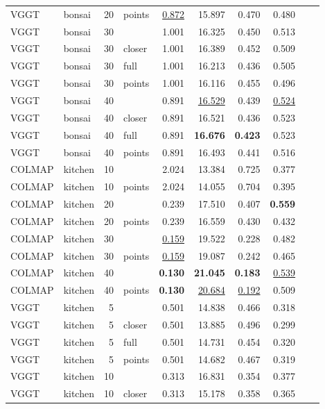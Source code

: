 \begin{table}[H]
\begin{tabular}{llrlrrrrll}
VGGT & bonsai & 20 & points & \underline{0.872} & 15.897 & 0.470 & 0.480 &  &  \\
VGGT & bonsai & 30 &  & 1.001 & 16.325 & 0.450 & 0.513 &  &  \\
VGGT & bonsai & 30 & closer & 1.001 & 16.389 & 0.452 & 0.509 &  &  \\
VGGT & bonsai & 30 & full & 1.001 & 16.213 & 0.436 & 0.505 &  &  \\
VGGT & bonsai & 30 & points & 1.001 & 16.116 & 0.455 & 0.496 &  &  \\
VGGT & bonsai & 40 &  & 0.891 & \underline{16.529} & 0.439 & \underline{0.524} &  &  \\
VGGT & bonsai & 40 & closer & 0.891 & 16.521 & 0.436 & 0.523 &  &  \\
VGGT & bonsai & 40 & full & 0.891 & \textbf{16.676} & \textbf{0.423} & 0.523 &  &  \\
VGGT & bonsai & 40 & points & 0.891 & 16.493 & 0.441 & 0.516 &  &  \\
\midrule
COLMAP & kitchen & 10 &  & 2.024 & 13.384 & 0.725 & 0.377 &  &  \\
COLMAP & kitchen & 10 & points & 2.024 & 14.055 & 0.704 & 0.395 &  &  \\
COLMAP & kitchen & 20 &  & 0.239 & 17.510 & 0.407 & \textbf{0.559} &  &  \\
COLMAP & kitchen & 20 & points & 0.239 & 16.559 & 0.430 & 0.432 &  &  \\
COLMAP & kitchen & 30 &  & \underline{0.159} & 19.522 & 0.228 & 0.482 &  &  \\
COLMAP & kitchen & 30 & points & \underline{0.159} & 19.087 & 0.242 & 0.465 &  &  \\
COLMAP & kitchen & 40 &  & \textbf{0.130} & \textbf{21.045} & \textbf{0.183} & \underline{0.539} &  &  \\
COLMAP & kitchen & 40 & points & \textbf{0.130} & \underline{20.684} & \underline{0.192} & 0.509 &  &  \\
VGGT & kitchen & 5 &  & 0.501 & 14.838 & 0.466 & 0.318 &  &  \\
VGGT & kitchen & 5 & closer & 0.501 & 13.885 & 0.496 & 0.299 &  &  \\
VGGT & kitchen & 5 & full & 0.501 & 14.731 & 0.454 & 0.320 &  &  \\
VGGT & kitchen & 5 & points & 0.501 & 14.682 & 0.467 & 0.319 &  &  \\
VGGT & kitchen & 10 &  & 0.313 & 16.831 & 0.354 & 0.377 &  &  \\
VGGT & kitchen & 10 & closer & 0.313 & 15.178 & 0.358 & 0.365 &  &  \\

\end{tabular}
\end{table}
